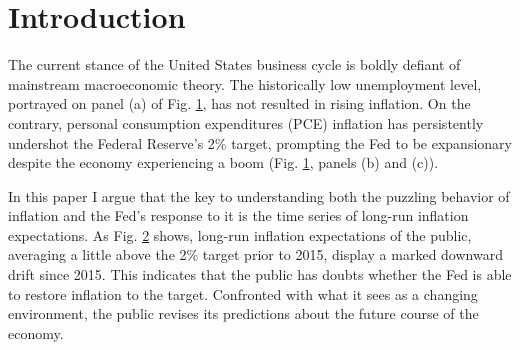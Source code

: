 \documentclass[11pt]{article}
\def \myFigPath {../../figures/}
\renewcommand{\[}{\begin{equation}}
\renewcommand{\]}{\end{equation}}
\def\mySmallFigScale{0.22}
\def\mySmallerFigScale{0.18}
\begin{document}
\section{Introduction}\label{introduction}

The current stance of the United States business cycle is boldly defiant of mainstream macroeconomic theory. The historically low unemployment level, portrayed on panel (a) of Fig. \ref{urate_pce_ffr}, has not resulted in rising inflation. On the contrary, personal consumption expenditures (PCE) inflation has persistently undershot the Federal Reserve's 2\% target, prompting the Fed to be expansionary despite the economy experiencing a boom (Fig. \ref{urate_pce_ffr}, panels (b) and (c)).

\begin{figure}[h!]
\caption{}
\label{urate_pce_ffr}
\end{figure}

In this paper I argue that the key to understanding both the puzzling behavior of inflation and the Fed's response to it is the time series of long-run inflation expectations. As Fig. \ref{epi} shows, long-run inflation expectations of the public, averaging a little above the 2\% target prior to 2015, display a marked downward drift since 2015. This indicates that the public has doubts whether the Fed is able to restore inflation to the target. Confronted with what it sees as a changing environment, the public revises its predictions about the future course of the economy.

\begin{figure}[h!]
\caption{}
\label{epi}
\end{figure}
\end{document}
